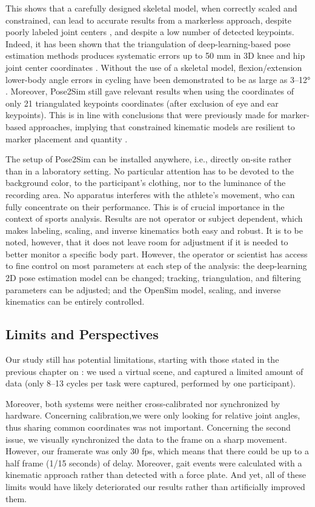 This shows that a carefully designed skeletal model, when correctly scaled and constrained, can lead to accurate results from a markerless approach, despite poorly labeled joint centers \cite{Needham2021b, Wade2021}, and despite a low number of detected keypoints. Indeed, it has been shown that the triangulation of deep-learning-based pose estimation methods produces systematic errors up to 50 mm in 3D knee and hip joint center coordinates \cite{Needham2021b}. Without the use of a skeletal model, flexion/extension lower-body angle errors in cycling have been demonstrated to be as large as 3–12° \cite{Bini2021}. Moreover, Pose2Sim still gave relevant results when using the coordinates of only 21 triangulated keypoints coordinates (after exclusion of eye and ear keypoints). This is in line with conclusions that were previously made for marker-based approaches, implying that constrained kinematic models are resilient to marker placement and quantity \cite{Slater2018}.

The setup of Pose2Sim can be installed anywhere, i.e., directly on-site rather than in a laboratory setting. No particular attention has to be devoted to the background color, to the participant’s clothing, nor to the luminance of the recording area. No apparatus interferes with the athlete’s movement, who can fully concentrate on their performance. This is of crucial importance in the context of sports analysis. Results are not operator or subject dependent, which makes labeling, scaling, and inverse kinematics both easy and robust. It is to be noted, however, that it does not leave room for adjustment if it is needed to better monitor a specific body part. However, the operator or scientist has access to fine control on most parameters at each step of the analysis: the deep-learning 2D pose estimation model can be changed; tracking, triangulation, and filtering parameters can be adjusted; and the OpenSim model, scaling, and inverse kinematics can be entirely controlled.


\subsection{Limits and Perspectives}

Our study still has potential limitations, starting with those stated in the previous chapter on : we used a virtual scene, and captured a limited amount of data (only 8–13 cycles per task were captured, performed by one participant). 

Moreover, both systems were neither cross-calibrated nor synchronized by hardware. Concerning calibration,we were only looking for relative joint angles, thus sharing common coordinates was not important. Concerning the second issue, we visually synchronized the data to the frame on a sharp movement. However, our framerate was only 30 fps, which means that there could be up to a half frame (1/15 seconds) of delay. Moreover, gait events were calculated with a kinematic approach \cite{Zeni2008} rather than detected with a force plate. And yet, all of these limits would have likely deteriorated our results rather than artificially improved them. 


